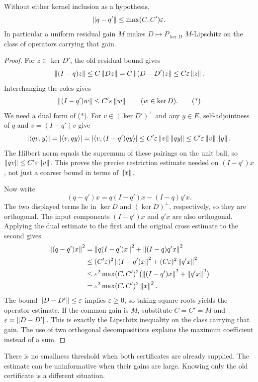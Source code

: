 \begin{theorem}\label{KS48}
Without either kernel inclusion as a hypothesis,
\begin{equation}\label{eq:motion}
 \left\lVert q-q'\right\rVert\le\max(C,C')\varepsilon.
\end{equation}
In particular a uniform residual gain \(M\) makes \(D\mapsto P_{\ker D}\) \(M\)-Lipschitz on the class of operators carrying that gain.
\end{theorem}
\begin{proof}
For $z\in\ker D'$, the old residual bound gives
\[
 \left\lVert(I-q)z\right\rVert\le C\left\lVert Dz\right\rVert
 =C\left\lVert(D-D')z\right\rVert\le C\varepsilon\left\lVert z\right\rVert.
\]
Interchanging the roles gives
\[
 \left\lVert(I-q')w\right\rVert\le C'\varepsilon\left\lVert w\right\rVert
 \qquad(w\in\ker D).                                      \tag{*}
\]
We need a dual form of (*). For $v\in(\ker D')^\perp$ and any $y\in E$, self-adjointness of $q$ and $v=(I-q')v$ give
\[
 |\langle qv,y\rangle|
 =|\langle v,qy\rangle|
 =|\langle v,(I-q')qy\rangle|
 \le C'\varepsilon\left\lVert v\right\rVert\left\lVert qy\right\rVert
 \le C'\varepsilon\left\lVert v\right\rVert\left\lVert y\right\rVert.
\]
The Hilbert norm equals the supremum of these pairings on the unit ball, so
$\left\lVert qv\right\rVert\le C'\varepsilon\left\lVert v\right\rVert$. This proves the precise restriction estimate needed on $(I-q')x$, not just a coarser bound in terms of $\left\lVert x\right\rVert$.

Now write
\[
 (q-q')x=q(I-q')x-(I-q)q'x.
\]
The two displayed terms lie in $\ker D$ and $(\ker D)^\perp$, respectively, so they are orthogonal. The input components $(I-q')x$ and $q'x$ are also orthogonal. Applying the dual estimate to the first and the original cross estimate to the second gives
\[
\begin{aligned}
 \left\lVert(q-q')x\right\rVert^2
 &=\left\lVert q(I-q')x\right\rVert^2+\left\lVert(I-q)q'x\right\rVert^2\\
 &\le (C'\varepsilon)^2\left\lVert(I-q')x\right\rVert^2
      +(C\varepsilon)^2\left\lVert q'x\right\rVert^2\\
 &\le\varepsilon^2\max(C,C')^2
       \bigl(\left\lVert(I-q')x\right\rVert^2+\left\lVert q'x\right\rVert^2\bigr)\\
 &=\varepsilon^2\max(C,C')^2\left\lVert x\right\rVert^2.
\end{aligned}
\]
The bound $\left\lVert D-D'\right\rVert\le\varepsilon$ implies $\varepsilon\ge0$, so taking square roots yields the operator estimate. If the common gain is $M$, substitute $C=C'=M$ and $\varepsilon=\left\lVert D-D'\right\rVert$. This is exactly the Lipschitz inequality on the class carrying that gain. The use of two orthogonal decompositions explains the maximum coefficient instead of a sum.
\end{proof}
There is no smallness threshold when both certificates are already supplied. The estimate can be uninformative when their gains are large. Knowing only the old certificate is a different situation.

